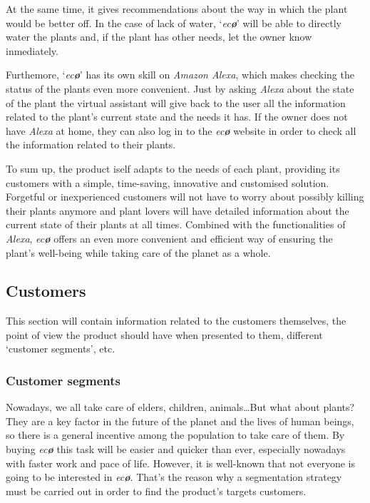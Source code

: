 \documentclass[english,runningheads,a4paper]{llncs}[2018/03/10]
\begin{document}
    At the same time, it gives recommendations about the way in which the plant
    would be better off. In the case of lack of water, `\textit{ec\textbf{\o}}'
    will be able to directly water the plants and, if the plant has other needs,
    let the owner know inmediately.

    Furthemore, `\textit{ec\textbf{\o}}' has its own skill on \textit{Amazon
    Alexa}, which makes checking the status of the plants even more convenient.
    Just by asking \textit{Alexa} about the state of the plant the virtual
    assistant will give back to the user all the information related to the
    plant's current state and the needs it has. If the owner does not have
    \textit{Alexa} at home, they can also log in to the \textit{ec\textbf{\o}}
    website in order to check all the information related to their plants.

    To sum up, the product iself adapts to the needs of each plant, providing
    its customers with a simple, time-saving, innovative and customised
    solution. Forgetful or inexperienced customers will not have to worry about
    possibly killing their plants anymore and plant lovers will have detailed
    information about the current state of their plants at all times. Combined
    with the functionalities of \textit{Alexa}, \textit{ec\textbf{\o}} offers an
    even more convenient and efficient way of ensuring the plant's well-being
    while taking care of the planet as a whole.


    \subsection*{Customers}

    This section will contain information related to the customers themselves,
    the point of view the product should have when presented to them, different
    `customer segments', etc.


        \subsubsection*{Customer segments}

        Nowadays, we all take care of elders, children, animals\ldots But what
        about plants? They are a key factor in the future of the planet and the
        lives of human beings, so there is a general incentive among the
        population to take care of them. By buying \textit{ec\textbf{\o}} this
        task will be easier and quicker than ever, especially nowadays with
        faster work and pace of life. However, it is well-known that not
        everyone is going to be interested in \textit{ec\textbf{\o}}. That's the
        reason why a segmentation strategy must be carried out in order to find
        the product's targets customers.
\end{document}

